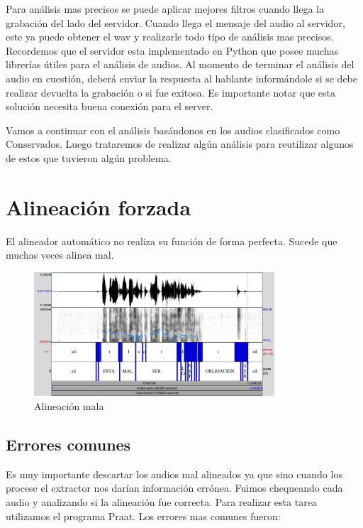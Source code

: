 \documentclass[11pt,a4paper,twoside]{tesis}
\begin{document}
Para análisis mas precisos se puede aplicar mejores filtros cuando llega la grabación del lado del servidor. Cuando llega el mensaje del audio al servidor, este ya puede obtener el wav y realizarle todo tipo de análisis mas precisos. Recordemos que el servidor esta implementado en Python que posee muchas librerías útiles para el análisis de audios. Al momento de terminar el análisis del audio en cuestión, deberá enviar la respuesta al hablante informándole si se debe realizar devuelta la grabación o si fue exitosa. Es importante notar que esta solución necesita buena conexión para el server. 

Vamos a continuar con el análisis basándonos en los audios clasificados como Conservados. Luego trataremos de realizar algún análisis para reutilizar algunos de estos que tuvieron algún problema. 

\section{Alineación forzada}

El alineador automático no realiza su función de forma perfecta. Sucede que muchas veces alinea mal. 

\begin{figure}[h!]
    \centerline{\includegraphics[width=0.8\textwidth]{alineacion_mala_inf} }
    \caption{Alineación mala}
\end{figure}


\subsection{Errores comunes}

Es muy importante descartar los audios mal alineados ya que sino cuando los procese el extractor nos darían información errónea. Fuimos chequeando cada audio y analizando si la alineación fue correcta. Para realizar esta tarea utilizamos el programa Praat. Los errores mas comunes fueron:
\end{document}
